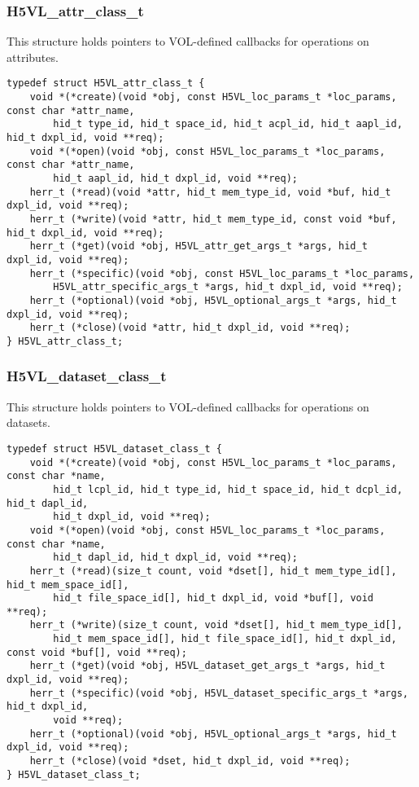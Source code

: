 \subsubsection{H5VL\_attr\_class\_t}

This structure holds pointers to VOL-defined callbacks for operations on attributes.
\begin{verbatim}
typedef struct H5VL_attr_class_t {
    void *(*create)(void *obj, const H5VL_loc_params_t *loc_params, const char *attr_name, 
        hid_t type_id, hid_t space_id, hid_t acpl_id, hid_t aapl_id, hid_t dxpl_id, void **req);
    void *(*open)(void *obj, const H5VL_loc_params_t *loc_params, const char *attr_name, 
        hid_t aapl_id, hid_t dxpl_id, void **req);
    herr_t (*read)(void *attr, hid_t mem_type_id, void *buf, hid_t dxpl_id, void **req);
    herr_t (*write)(void *attr, hid_t mem_type_id, const void *buf, hid_t dxpl_id, void **req);
    herr_t (*get)(void *obj, H5VL_attr_get_args_t *args, hid_t dxpl_id, void **req);
    herr_t (*specific)(void *obj, const H5VL_loc_params_t *loc_params, 
        H5VL_attr_specific_args_t *args, hid_t dxpl_id, void **req);
    herr_t (*optional)(void *obj, H5VL_optional_args_t *args, hid_t dxpl_id, void **req);
    herr_t (*close)(void *attr, hid_t dxpl_id, void **req);
} H5VL_attr_class_t;
\end{verbatim}

\subsubsection{H5VL\_dataset\_class\_t}
This structure holds pointers to VOL-defined callbacks for operations on datasets.
\begin{verbatim}
typedef struct H5VL_dataset_class_t {
    void *(*create)(void *obj, const H5VL_loc_params_t *loc_params, const char *name, 
        hid_t lcpl_id, hid_t type_id, hid_t space_id, hid_t dcpl_id, hid_t dapl_id, 
        hid_t dxpl_id, void **req);
    void *(*open)(void *obj, const H5VL_loc_params_t *loc_params, const char *name,     
        hid_t dapl_id, hid_t dxpl_id, void **req);
    herr_t (*read)(size_t count, void *dset[], hid_t mem_type_id[], hid_t mem_space_id[],
        hid_t file_space_id[], hid_t dxpl_id, void *buf[], void **req);
    herr_t (*write)(size_t count, void *dset[], hid_t mem_type_id[], 
        hid_t mem_space_id[], hid_t file_space_id[], hid_t dxpl_id, const void *buf[], void **req);
    herr_t (*get)(void *obj, H5VL_dataset_get_args_t *args, hid_t dxpl_id, void **req);
    herr_t (*specific)(void *obj, H5VL_dataset_specific_args_t *args, hid_t dxpl_id, 
        void **req);
    herr_t (*optional)(void *obj, H5VL_optional_args_t *args, hid_t dxpl_id, void **req);
    herr_t (*close)(void *dset, hid_t dxpl_id, void **req);
} H5VL_dataset_class_t;
\end{verbatim}


